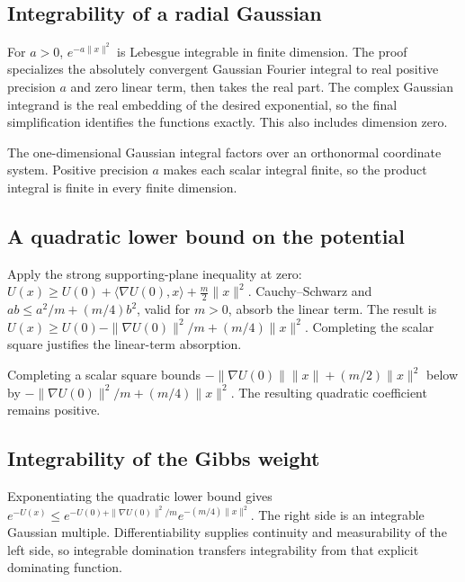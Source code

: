 \documentclass[11pt,a4paper]{article}
\begin{document}
\subsection{\texorpdfstring{Integrability of a radial Gaussian}{Integrability of a radial Gaussian}}


For \(a>0\), \(e^{-a\|x\|^2}\) is Lebesgue integrable in finite dimension. The proof specializes the absolutely convergent Gaussian Fourier integral to real positive precision \(a\) and zero linear term, then takes the real part. The complex Gaussian integrand is the real embedding of the desired exponential, so the final simplification identifies the functions exactly. This also includes dimension zero.



The one-dimensional Gaussian integral factors over an orthonormal coordinate system. Positive precision \(a\) makes each scalar integral finite, so the product integral is finite in every finite dimension.


\subsection{\texorpdfstring{A quadratic lower bound on the potential}{A quadratic lower bound on the potential}}


Apply the strong supporting-plane inequality at zero: \(U(x)\ge U(0)+\langle\nabla U(0),x\rangle+\frac m2\|x\|^2\). Cauchy–Schwarz and \(ab\le a^2/m+(m/4)b^2\), valid for \(m>0\), absorb the linear term. The result is \(U(x)\ge U(0)-\|\nabla U(0)\|^2/m+(m/4)\|x\|^2\). Completing the scalar square justifies the linear-term absorption.



Completing a scalar square bounds \(-\|\nabla U(0)\|\|x\|+(m/2)\|x\|^2\) below by \(-\|\nabla U(0)\|^2/m+(m/4)\|x\|^2\). The resulting quadratic coefficient remains positive.


\subsection{\texorpdfstring{Integrability of the Gibbs weight}{Integrability of the Gibbs weight}}


Exponentiating the quadratic lower bound gives \(e^{-U(x)}\le e^{-U(0)+\|\nabla U(0)\|^2/m}e^{-(m/4)\|x\|^2}\). The right side is an integrable Gaussian multiple. Differentiability supplies continuity and measurability of the left side, so integrable domination transfers integrability from that explicit dominating function.
\end{document}

